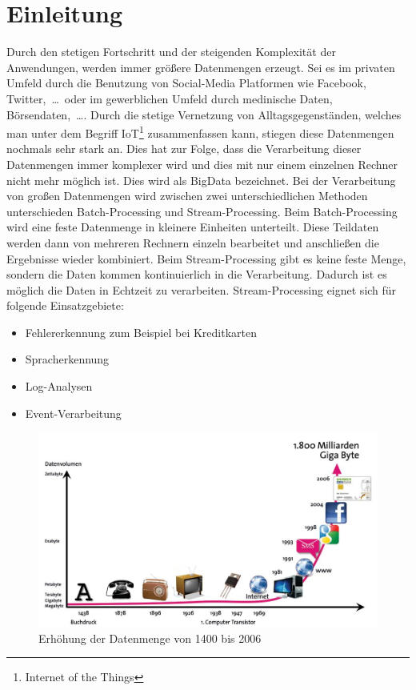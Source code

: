 \chapter{Einleitung}
Durch den stetigen Fortschritt und der steigenden Komplexität der Anwendungen,
werden immer größere Datenmengen erzeugt. Sei es im privaten Umfeld durch die
Benutzung von Social-Media Platformen wie Facebook, Twitter,~\dots~oder im
gewerblichen Umfeld durch medinische Daten, Börsendaten,~\dots . Durch die
stetige Vernetzung von Alltagsgegenständen, welches man unter dem Begriff
IoT\footnote{Internet of the Things} zusammenfassen kann, stiegen diese
Datenmengen nochmals sehr stark an. Dies hat zur Folge, dass die Verarbeitung
dieser Datenmengen immer komplexer wird und dies mit nur einem einzelnen Rechner
nicht mehr möglich ist. Dies wird als \gls{BigData} bezeichnet. Bei der
Verarbeitung von großen Datenmengen wird zwischen zwei unterschiedlichen Methoden
unterschieden Batch-Processing und Stream-Processing. Beim Batch-Processing wird
eine feste Datenmenge in kleinere Einheiten unterteilt. Diese Teildaten werden
dann von mehreren Rechnern einzeln bearbeitet und anschließen die Ergebnisse
wieder kombiniert. Beim Stream-Processing gibt es keine feste Menge, sondern
die Daten kommen kontinuierlich in die Verarbeitung. Dadurch ist es möglich die
Daten in Echtzeit zu verarbeiten. Stream-Processing eignet sich für folgende
Einsatzgebiete:

\begin{itemize}
    \item Fehlererkennung zum Beispiel bei Kreditkarten
    \item Spracherkennung
    \item Log-Analysen
    \item Event-Verarbeitung
\end{itemize}

\begin{figure}
    \centering
    \includegraphics[scale=0.375]{../material/images/bitkom-lf-bigdata-2012-data_grow.jpg}
    \caption{Erhöhung der Datenmenge von 1400 bis 2006 \parencite{Weber2012}}
    \label{fig:data-grow}
\end{figure}

